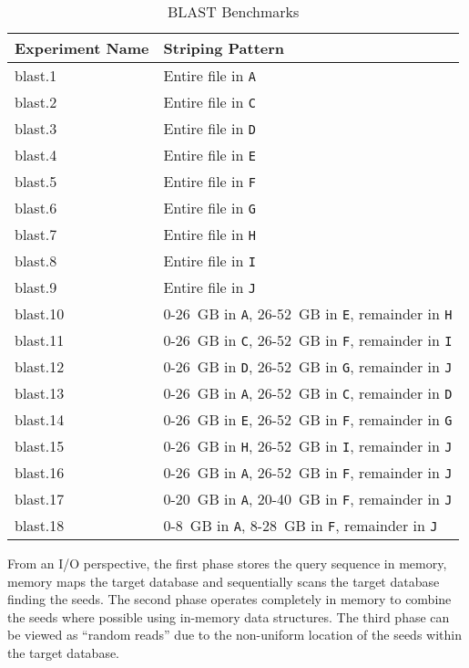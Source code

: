 \documentclass[conference,compsoc]{IEEEtran}
\begin{document}
\begin{table}[t]
\centering
\caption{BLAST Benchmarks}
\label{tab:blast_benchmarks}
\begin{tabular}{ll}
Experiment Name & Striping Pattern \\
\hline
blast.1  & Entire file in \texttt{A} \\
blast.2  & Entire file in \texttt{C} \\
blast.3  & Entire file in \texttt{D} \\
blast.4  & Entire file in \texttt{E} \\
blast.5  & Entire file in \texttt{F} \\
blast.6  & Entire file in \texttt{G} \\
blast.7  & Entire file in \texttt{H} \\
blast.8  & Entire file in \texttt{I} \\
blast.9  & Entire file in \texttt{J} \\
blast.10 & 0-26~GB in \texttt{A}, 26-52~GB in \texttt{E}, remainder in \texttt{H} \\
blast.11 & 0-26~GB in \texttt{C}, 26-52~GB in \texttt{F}, remainder in \texttt{I} \\
blast.12 & 0-26~GB in \texttt{D}, 26-52~GB in \texttt{G}, remainder in \texttt{J} \\
blast.13 & 0-26~GB in \texttt{A}, 26-52~GB in \texttt{C}, remainder in \texttt{D} \\
blast.14 & 0-26~GB in \texttt{E}, 26-52~GB in \texttt{F}, remainder in \texttt{G} \\
blast.15 & 0-26~GB in \texttt{H}, 26-52~GB in \texttt{I}, remainder in \texttt{J} \\
blast.16 & 0-26~GB in \texttt{A}, 26-52~GB in \texttt{F}, remainder in \texttt{J} \\
blast.17 & 0-20~GB in \texttt{A}, 20-40~GB in \texttt{F}, remainder in \texttt{J} \\
blast.18 & 0-8~GB in \texttt{A}, 8-28~GB in \texttt{F}, remainder in \texttt{J} \\
\end{tabular}
\end{table}










From an I/O perspective, the first phase stores the query sequence in memory, memory maps the target database and sequentially scans the target database finding the seeds. The second phase operates completely in memory to combine the seeds where possible using in-memory data structures. The third phase can be viewed as ``random reads'' due to the non-uniform location of the seeds within the target database.
\end{document}

